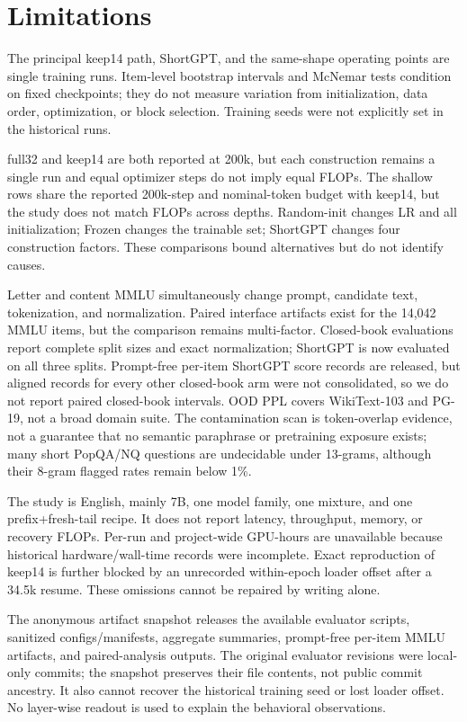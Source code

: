 \section*{Limitations}

The principal keep14 path, ShortGPT, and the same-shape operating points are
single training runs. Item-level bootstrap intervals and McNemar tests condition
on fixed checkpoints; they do not measure variation from initialization, data
order, optimization, or block selection. Training seeds were not explicitly
set in the historical runs.

full32 and keep14 are both reported at 200k, but each construction remains a
single run and equal optimizer steps do not imply equal FLOPs. The shallow rows
share the reported 200k-step and nominal-token budget with keep14, but the study
does not match FLOPs across depths.
Random-init changes LR and all initialization; Frozen changes the trainable
set; ShortGPT changes four construction factors. These comparisons bound
alternatives but do not identify causes.

Letter and content MMLU simultaneously change prompt, candidate text,
tokenization, and normalization. Paired interface artifacts exist for the
14,042 MMLU items, but the comparison remains multi-factor. Closed-book
evaluations report complete split sizes and exact normalization; ShortGPT is
now evaluated on all three splits. Prompt-free per-item ShortGPT score records
are released, but aligned records for every other closed-book arm were not
consolidated, so we do not report paired closed-book intervals. OOD PPL covers
WikiText-103 and PG-19, not a broad domain suite. The contamination scan is
token-overlap evidence, not a guarantee that no semantic paraphrase or
pretraining exposure exists; many short PopQA/NQ questions are undecidable
under 13-grams, although their 8-gram flagged rates remain below 1\%.

The study is English, mainly 7B, one model family, one mixture, and one
prefix+fresh-tail recipe. It does not report latency, throughput, memory, or
recovery FLOPs. Per-run and project-wide GPU-hours are unavailable because
historical hardware/wall-time records were incomplete. Exact reproduction of
keep14 is further blocked by an unrecorded within-epoch loader offset after a
34.5k resume. These omissions cannot be repaired by writing alone.

The anonymous artifact snapshot releases the available evaluator scripts,
sanitized configs/manifests, aggregate summaries, prompt-free per-item MMLU
artifacts, and paired-analysis outputs. The original evaluator revisions were
local-only commits; the snapshot preserves their file contents, not public
commit ancestry. It also cannot recover the historical training seed or lost
loader offset. No layer-wise readout is used to explain the behavioral
observations.
